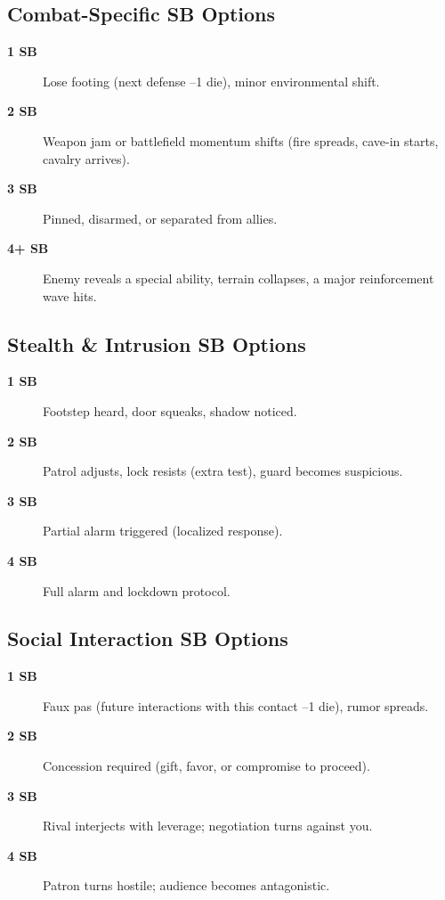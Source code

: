 \subsection{Combat-Specific SB Options}
\label{subsec:combat-sb}

\begin{description}
\item[\textbf{1 SB}] Lose footing (next defense –1 die), minor environmental shift.
\item[\textbf{2 SB}] Weapon jam or battlefield momentum shifts (fire spreads, cave-in starts, cavalry arrives).
\item[\textbf{3 SB}] Pinned, disarmed, or separated from allies.
\item[\textbf{4+ SB}] Enemy reveals a special ability, terrain collapses, a major reinforcement wave hits.
\end{description}

\subsection{Stealth \& Intrusion SB Options}
\label{subsec:stealth-sb}

\begin{description}
\item[\textbf{1 SB}] Footstep heard, door squeaks, shadow noticed.
\item[\textbf{2 SB}] Patrol adjusts, lock resists (extra test), guard becomes suspicious.
\item[\textbf{3 SB}] Partial alarm triggered (localized response).
\item[\textbf{4 SB}] Full alarm and lockdown protocol.
\end{description}

\subsection{Social Interaction SB Options}
\label{subsec:social-sb}

\begin{description}
\item[\textbf{1 SB}] Faux pas (future interactions with this contact –1 die), rumor spreads.
\item[\textbf{2 SB}] Concession required (gift, favor, or compromise to proceed).
\item[\textbf{3 SB}] Rival interjects with leverage; negotiation turns against you.
\item[\textbf{4 SB}] Patron turns hostile; audience becomes antagonistic.
\end{description}


